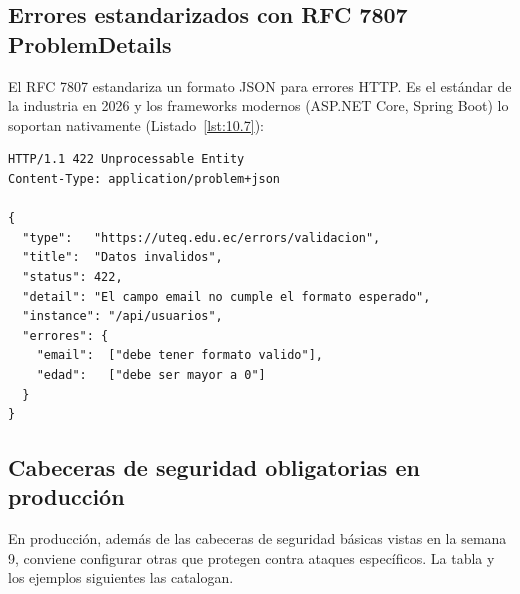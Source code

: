 \documentclass[11pt,a4paper,openany]{book}
\begin{document}
\subsection{Errores estandarizados con RFC 7807 ProblemDetails}

El RFC 7807 \cite{rfc7807} estandariza un formato JSON para errores
HTTP. Es el estándar de la industria en 2026 y los frameworks modernos
(ASP.NET Core, Spring Boot) lo soportan nativamente (Listado~\ref{lst:10.7}):

\begin{lstlisting}[style=js,numbers=none,caption={Respuesta de error según RFC 7807},label=lst:10.7]
HTTP/1.1 422 Unprocessable Entity
Content-Type: application/problem+json

{
  "type":   "https://uteq.edu.ec/errors/validacion",
  "title":  "Datos invalidos",
  "status": 422,
  "detail": "El campo email no cumple el formato esperado",
  "instance": "/api/usuarios",
  "errores": {
    "email":  ["debe tener formato valido"],
    "edad":   ["debe ser mayor a 0"]
  }
}
\end{lstlisting}

\subsection{Cabeceras de seguridad obligatorias en producción}

En producción, además de las cabeceras de seguridad básicas
vistas en la semana 9, conviene configurar otras que protegen contra
ataques específicos. La tabla y los ejemplos siguientes las catalogan.
\end{document}
